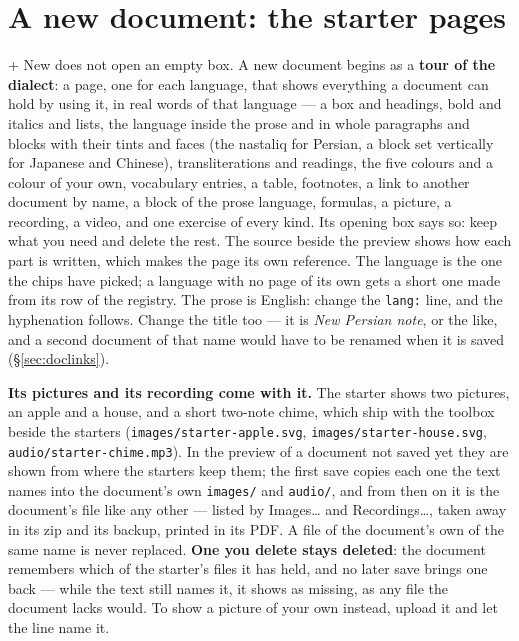 \documentclass[11pt,oneside]{report}
\newcommand{\file}[1]{\texttt{#1}}
\newcommand{\menu}[1]{\textsf{#1}}
\begin{document}
\section{A new document: the starter pages}
\label{sec:starters}

\menu{+ New} does not open an empty box. A new document begins as a
\textbf{tour of the dialect}: a page, one for each language, that shows
everything a document can hold by using it, in real words of that language
--- a box and headings, bold and italics and lists, the language inside the
prose and in whole paragraphs and blocks with their tints and faces (the
nastaliq for Persian, a block set vertically for Japanese and Chinese),
transliterations and readings, the five colours and a colour of your own,
vocabulary entries, a table, footnotes, a link to another document by name,
a block of the prose language, formulas, a picture, a recording, a video,
and one exercise of every kind. Its opening box says so: keep what you need
and delete the rest. The source beside the preview shows how each part is
written, which makes the page its own reference. The language is the one
the chips have picked; a language with no page of its own gets a short one
made from its row of the registry. The prose is English: change the
\texttt{lang:} line, and the hyphenation follows. Change the title too --- it
is \emph{New Persian note}, or the like, and a second document of that name
would have to be renamed when it is saved (\S\ref{sec:doclinks}).

\textbf{Its pictures and its recording come with it.} The starter shows two
pictures, an apple and a house, and a short two-note chime, which ship with
the toolbox beside the starters (\file{images/starter-apple.svg},
\file{images/starter-house.svg}, \file{audio/starter-chime.mp3}). In the
preview of a document not saved yet they are shown from where the starters
keep them; the first save copies each one the text names into the document's
own \file{images/} and \file{audio/}, and from then on it is the document's
file like any other --- listed by \menu{Images\ldots} and
\menu{Recordings\ldots}, taken away in its zip and its backup, printed in
its PDF. A file of the document's own of the same name is never replaced.
\textbf{One you delete stays deleted}: the document remembers which of the
starter's files it has held, and no later save brings one back --- while the
text still names it, it shows as missing, as any file the document lacks
would. To show a picture of your own instead, upload it and let the line
name it.
\end{document}
